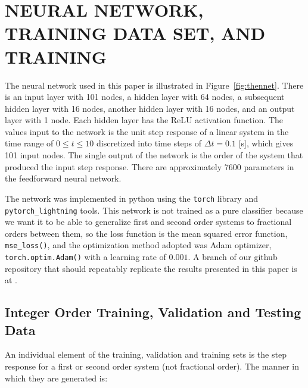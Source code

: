 \section{NEURAL NETWORK, TRAINING DATA SET, AND TRAINING}
\label{sec:network}

  The neural network used in this paper is illustrated in
  Figure~\ref{fig:thennet}. There is an input layer with 101 nodes, a hidden
  layer with 64 nodes, a subsequent hidden layer with 16 nodes, another hidden
  layer with 16 nodes, and an output layer with 1 node. Each hidden layer has
  the ReLU activation function. The values input to the network is the unit step
  response of a linear system in the time range of $0 \leq t \leq 10$
  discretized into time steps of $\Delta t = 0.1$ [s], which gives 101 input
  nodes. The single output of the network is the order of the system that
  produced the input step response. There are approximately 7600 parameters in
  the feedforward neural network. 

  The network was implemented in python using the \texttt{torch} library and
  \texttt{pytorch\_lightning} tools. This network is not trained as a pure
  classifier because we want it to be able to generalize first and second order
  systems to fractional orders between them, so the loss function is the mean
  squared error function, \texttt{mse\_loss()}, and the optimization method
  adopted was Adam optimizer, \texttt{torch.optim.Adam()} with a learning rate
  of $0.001$. A branch of our github repository that should repeatably replicate
  the results presented in this paper is at
  \cite{Goodwine_Integer_trained_neural}.

\subsection{Integer Order Training, Validation and Testing Data}

  An individual element of the training, validation and training sets is the
  step response for a first or second order system (not fractional order). The
  manner in which they are generated is:

